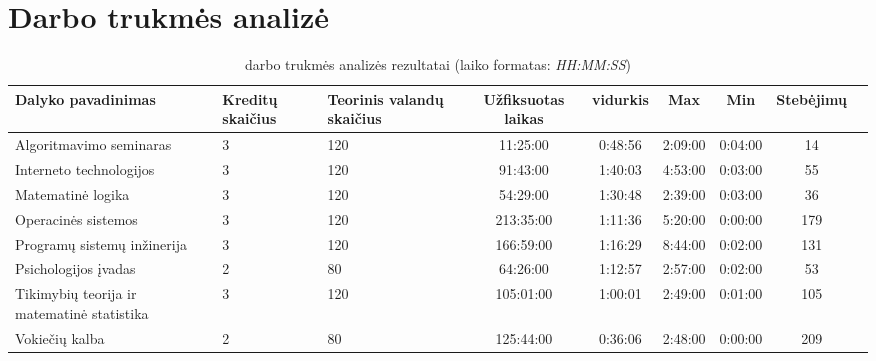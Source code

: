 \chapter{Darbo trukmės analizė}

\begin{sidewaystable}
\centering
\begin{tabular}{|l|p{50pt}|p{50pt}|c|c|c|c|c|c|}
  \hline
  {\bf Dalyko pavadinimas} & {\bf Kreditų skaičius} & {\bf Teorinis valandų skaičius} & {\bf Užfiksuotas laikas} & {\bf vidurkis } & {\bf Max} & {\bf Min} & {\bf Stebėjimų}  \\
  \hline
  Algoritmavimo seminaras & 3 & 120 & 11:25:00 & 0:48:56 & 2:09:00 & 0:04:00 & 14 \\
  \hline
  Interneto technologijos & 3 & 120 & 91:43:00 & 1:40:03 & 4:53:00 & 0:03:00 & 55 \\
  \hline
  Matematinė logika & 3 & 120 & 54:29:00  & 1:30:48 & 2:39:00 & 0:03:00 & 36 \\
  \hline
  Operacinės sistemos & 3 & 120 & 213:35:00 & 1:11:36 & 5:20:00 & 0:00:00 & 179 \\
  \hline
  Programų sistemų inžinerija & 3 & 120 & 166:59:00 & 1:16:29 & 8:44:00 & 0:02:00 & 131 \\
  \hline
  Psichologijos įvadas & 2 & 80 & 64:26:00 & 1:12:57 & 2:57:00 & 0:02:00 & 53 \\
  \hline
  Tikimybių teorija ir matematinė statistika & 3 & 120 & 105:01:00 & 1:00:01 & 2:49:00 & 0:01:00 & 105 \\
  \hline
  Vokiečių kalba & 2 & 80 & 125:44:00 & 0:36:06 & 2:48:00 & 0:00:00 & 209 \\
  \hline
\end{tabular}
\caption{darbo trukmės analizės rezultatai (laiko formatas:
  \emph{HH:MM:SS})}
\end{sidewaystable}
